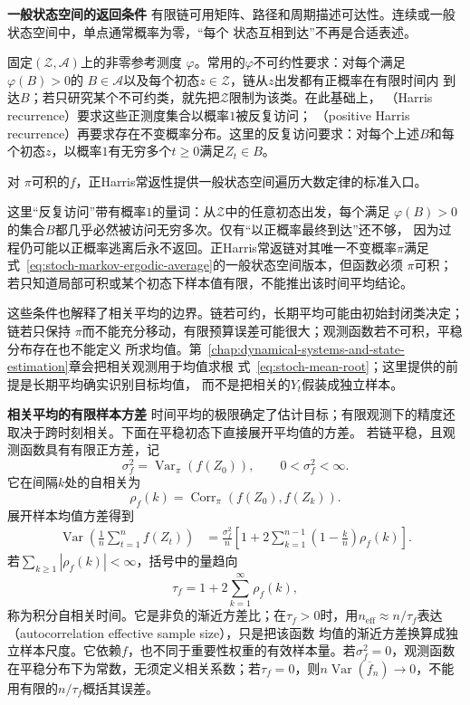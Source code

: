 \par\medskip\noindent\textbf{一般状态空间的返回条件}\quad
有限链可用矩阵、路径和周期描述可达性。连续或一般状态空间中，单点通常概率为零，“每个
状态互相到达”不再是合适表述。
\begin{definition}[一般状态空间的不可约性与Harris常返性]
  \label{def:stoch-harris-recurrence}
固定$(\mathcal{Z},\mathcal{A})$上的非零参考测度
$\varphi$。常用的$\varphi$不可约性要求：对每个满足$\varphi(B)>0$的
$B\in\mathcal{A}$以及每个初态$z\in\mathcal{Z}$，链从$z$出发都有正概率在有限时间内
到达$B$；若只研究某个不可约类，就先把$\mathcal{Z}$限制为该类。在此基础上，
（Harris recurrence）要求这些正测度集合以概率$1$被反复访问；
（positive Harris recurrence）再要求存在不变概率分布。这里的反复访问要求：对每个上述\(B\)和每个初态\(z\)，以概率\(1\)有无穷多个\(t\geq0\)满足\(Z_t\in B\)。
\end{definition}
对
$\pi$可积的$f$，正Harris常返性提供一般状态空间遍历大数定律的标准入口。

这里“反复访问”带有概率$1$的量词：从$\mathcal{Z}$中的任意初态出发，每个满足
$\varphi(B)>0$的集合$B$都几乎必然被访问无穷多次。仅有“以正概率最终到达”还不够，
因为过程仍可能以正概率逃离后永不返回。正Harris常返链对其唯一不变概率$\pi$满足
式~\eqref{eq:stoch-markov-ergodic-average}的一般状态空间版本，但函数必须
$\pi$可积；若只知道局部可积或某个初态下样本值有限，不能推出该时间平均结论。

这些条件也解释了相关平均的边界。链若可约，长期平均可能由初始封闭类决定；链若只保持
$\pi$而不能充分移动，有限预算误差可能很大；观测函数若不可积，平稳分布存在也不能定义
所求均值。第~\ref{chap:dynamical-systems-and-state-estimation}章会把相关观测用于均值求根
式~\eqref{eq:stoch-mean-root}；这里提供的前提是长期平均确实识别目标均值，
而不是把相关的$Y_t$假装成独立样本。

\par\medskip\noindent\textbf{相关平均的有限样本方差}\quad
时间平均的极限确定了估计目标；有限观测下的精度还取决于跨时刻相关。下面在平稳初态下直接展开平均值的方差。
若链平稳，且观测函数具有有限正方差，记
\[
\sigma_f^2=\operatorname{Var}_{\pi}(f(Z_0)),\qquad 0<\sigma_f^2<\infty.
\]
它在间隔\(k\)处的自相关为
\[
\rho_f(k)=\operatorname{Corr}_{\pi}(f(Z_0),f(Z_k)).
\]
展开样本均值方差得到
\begin{align}
  \operatorname{Var}\left(
    \frac1n\sum_{t=1}^{n}f(Z_t)
  \right)
  &=
  \frac{\sigma_f^2}{n}
  \left[
    1+
    2\sum_{k=1}^{n-1}
      \left(1-\frac{k}{n}\right)\rho_f(k)
  \right].
  \label{eq:stoch-markov-average-variance}
\end{align}
若$\sum_{k\geq1}|\rho_f(k)|<\infty$，括号中的量趋向
\[
  \tau_f
  =
  1+2\sum_{k=1}^{\infty}\rho_f(k),
\]
称为积分自相关时间。它是非负的渐近方差比；在\(\tau_f>0\)时，用$n_{\mathrm{eff}}\approx n/\tau_f$表达
（autocorrelation effective sample size），只是把该函数
均值的渐近方差换算成独立样本尺度。它依赖$f$，也不同于重要性权重的有效样本量。若\(\sigma_f^2=0\)，观测函数在平稳分布下为常数，无须定义相关系数；若\(\tau_f=0\)，则\(n\operatorname{Var}(\overline f_n)\to0\)，不能用有限的\(n/\tau_f\)概括其误差。

